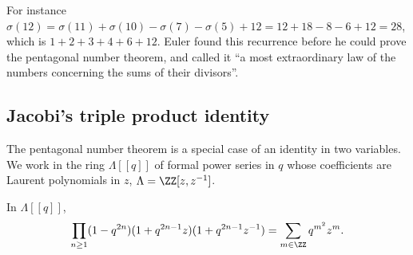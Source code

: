 For instance $\sigma(12) = \sigma(11) + \sigma(10) - \sigma(7) - \sigma(5) + 12 = 12 + 18 - 8 - 6 + 12 = 28$, which is $1 + 2 + 3 + 4 + 6 + 12$. Euler found this recurrence before he could prove the
pentagonal number theorem, and called it ``a most extraordinary law of the numbers concerning the sums of their divisors''.

\subsection{Jacobi's triple product identity}\label{generating-functions:subsection-triple-product}

The pentagonal number theorem is a special case of an identity in two variables. We work in the ring $\Lambda[[q]]$ of formal power series in $q$ whose coefficients are Laurent polynomials in $z$,
$\Lambda = \ZZ[z, z^{-1}]$.

\begin{theorem}\label{generating-functions:theorem-triple-product}
In $\Lambda[[q]]$,
\[
\prod_{n \geq 1}(1 - q^{2n})(1 + q^{2n-1}z)(1 + q^{2n-1}z^{-1}) = \sum_{m \in \ZZ}q^{m^2}z^m.
\]
\end{theorem}

